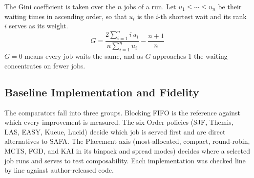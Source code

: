 \documentclass{ieeetj}
\begin{document}
The Gini coefficient is taken over the $n$ jobs of a run. Let $u_1\le\cdots\le u_n$ be their waiting times in ascending order, so that $u_i$ is the $i$-th shortest wait and its rank $i$ serves as its weight.
\begin{equation}
G = \frac{2\sum_{i=1}^{n} i\,u_i}{n\sum_{i=1}^{n} u_i} - \frac{n+1}{n}
\label{eq:gini}
\end{equation}
$G=0$ means every job waits the same, and as $G$ approaches 1 the waiting concentrates on fewer jobs.

\subsection{Baseline Implementation and Fidelity}\label{eval:impl}
The comparators fall into three groups. Blocking FIFO is the reference against which every improvement is measured. The six Order policies (SJF, Themis, LAS, EASY, Kueue, Lucid) decide which job is served first and are direct alternatives to SAFA. The Placement axis (most-allocated, compact, round-robin, MCTS, FGD, and KAI in its binpack and spread modes) decides where a selected job runs and serves to test composability. Each implementation was checked line by line against author-released code.
\end{document}
